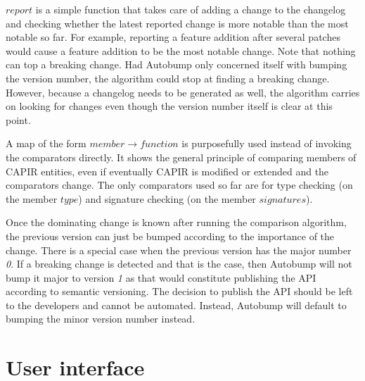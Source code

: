 \documentclass{l4proj}
\begin{document}


$report$ is a simple function that takes care of adding a change to
the changelog and checking whether the latest reported change is more
notable than the most notable so far. For example, reporting a feature
addition after several patches would cause a feature addition to be
the most notable change. Note that nothing can top a breaking change.
Had Autobump only concerned itself with bumping the version number,
the algorithm could stop at finding a breaking change. However,
because a changelog needs to be generated as well, the algorithm
carries on looking for changes even though the version number itself
is clear at this point.

A map of the form $member \rightarrow function$ is purposefully used
instead of invoking the comparators directly. It shows the general
principle of comparing members of CAPIR entities, even if eventually
CAPIR is modified or extended and the comparators change. The only
comparators used so far are for type checking (on the member $type$)
and signature checking (on the member $signatures$).


Once the dominating change is known after running the comparison
algorithm, the previous version can just be bumped according to the
importance of the change. There is a special case when the previous
version has the major number \textit{0}. If a breaking change is
detected and that is the case, then Autobump will not bump it major to
version \textit{1} as that would constitute publishing the API
according to semantic versioning. The decision to publish the API
should be left to the developers and cannot be automated. Instead,
Autobump will default to bumping the minor version number instead.

\section{User interface}
\end{document}
